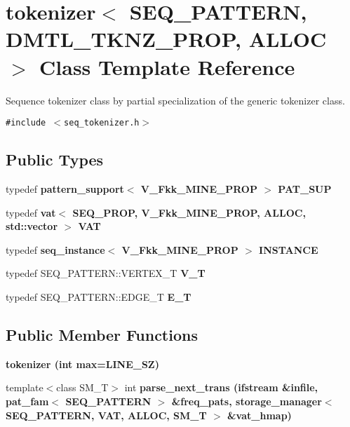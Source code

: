 \section{tokenizer$<$ SEQ\_\-PATTERN, DMTL\_\-TKNZ\_\-PROP, ALLOC $>$ Class Template Reference}
\label{classtokenizer_3_01SEQ__PATTERN_00_01DMTL__TKNZ__PROP_00_01ALLOC_01_4}
Sequence tokenizer class by partial specialization of the generic tokenizer class.  


{\tt \#include $<$seq\_\-tokenizer.h$>$}

\subsection*{Public Types}
\begin{CompactItemize}
\item 
typedef \bf{pattern\_\-support}$<$ V\_\-Fkk\_\-MINE\_\-PROP $>$ \textbf{PAT\_\-SUP}\label{classtokenizer_3_01SEQ__PATTERN_00_01DMTL__TKNZ__PROP_00_01ALLOC_01_4_be01d57c7027c16dd683cbc1ce2a9ba7}

\item 
typedef \bf{vat}$<$ SEQ\_\-PROP, V\_\-Fkk\_\-MINE\_\-PROP, ALLOC, std::vector $>$ \textbf{VAT}\label{classtokenizer_3_01SEQ__PATTERN_00_01DMTL__TKNZ__PROP_00_01ALLOC_01_4_9267427291fe4c9558b35768d98a9821}

\item 
typedef \bf{seq\_\-instance}$<$ V\_\-Fkk\_\-MINE\_\-PROP $>$ \textbf{INSTANCE}\label{classtokenizer_3_01SEQ__PATTERN_00_01DMTL__TKNZ__PROP_00_01ALLOC_01_4_8391e505a03cb21791af07661c8f5033}

\item 
typedef SEQ\_\-PATTERN::VERTEX\_\-T \textbf{V\_\-T}\label{classtokenizer_3_01SEQ__PATTERN_00_01DMTL__TKNZ__PROP_00_01ALLOC_01_4_41dcefc074e43d08a28048de5d9f7dc0}

\item 
typedef SEQ\_\-PATTERN::EDGE\_\-T \textbf{E\_\-T}\label{classtokenizer_3_01SEQ__PATTERN_00_01DMTL__TKNZ__PROP_00_01ALLOC_01_4_efaadd631cba9514563ff8676cc79902}

\end{CompactItemize}
\subsection*{Public Member Functions}
\begin{CompactItemize}
\item 
\bf{tokenizer} (int max=LINE\_\-SZ)
\item 
template$<$class SM\_\-T$>$ int \bf{parse\_\-next\_\-trans} (ifstream \&infile, \bf{pat\_\-fam}$<$ SEQ\_\-PATTERN $>$ \&freq\_\-pats, \bf{storage\_\-manager}$<$ SEQ\_\-PATTERN, \bf{VAT}, ALLOC, SM\_\-T $>$ \&vat\_\-hmap)
\end{CompactItemize}



